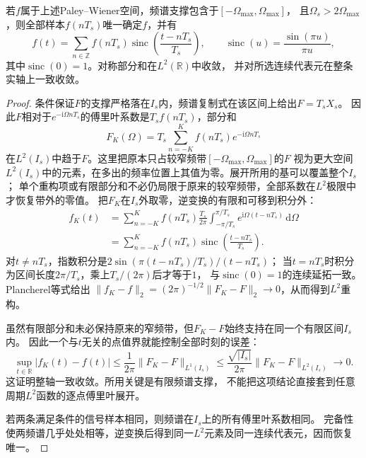 \begin{theorem}[带限信号的采样重构]
  \label{thm:signal-analysis-sampling}
  若$f$属于上述Paley--Wiener空间，频谱支撑包含于$[-\Omega_{\max},\Omega_{\max}]$，
  且$\Omega_s>2\Omega_{\max}$，则全部样本$f(nT_s)$唯一确定$f$，并有
  \begin{equation}
    f(t)=\sum_{n\in\mathbb Z}f(nT_s)
    \operatorname{sinc}\left(\frac{t-nT_s}{T_s}\right),
    \qquad \operatorname{sinc}(u)=\frac{\sin(\pi u)}{\pi u},
    \label{eq:signal-analysis-sinc-reconstruction}
  \end{equation}
  其中$\operatorname{sinc}(0)=1$。对称部分和在$L^2(\mathbb R)$中收敛，
  并对所选连续代表元在整条实轴上一致收敛。
\end{theorem}
\begin{proof}
  条件保证$F$的支撑严格落在$I_s$内，频谱复制式在该区间上给出$F=T_sX_s$。
  因此$F$相对于$e^{-\mathrm i\Omega nT_s}$的傅里叶系数是$T_sf(nT_s)$，部分和
  \[
    F_K(\Omega)=T_s\sum_{n=-K}^{K}f(nT_s)e^{-\mathrm i\Omega nT_s}
  \]
  在$L^2(I_s)$中趋于$F$。这里把原本只占较窄频带$[-\Omega_{\max},\Omega_{\max}]$的$F$
  视为更大空间$L^2(I_s)$中的元素，在多出的频率位置上其值为零。展开所用的基可以覆盖整个$I_s$；
  单个重构项或有限部分和不必仍局限于原来的较窄频带，全部系数在$L^2$极限中才恢复带外的零值。
  把$F_K$在$I_s$外取零，逆变换的有限和可移到积分外：
  \begin{align*}
    f_K(t)
    &=\sum_{n=-K}^{K}f(nT_s)\frac{T_s}{2\pi}
      \int_{-\pi/T_s}^{\pi/T_s}e^{\mathrm i\Omega(t-nT_s)}\,\mathrm d\Omega\\
    &=\sum_{n=-K}^{K}f(nT_s)
      \operatorname{sinc}\left(\frac{t-nT_s}{T_s}\right).
  \end{align*}
  对$t\neq nT_s$，指数积分是$2\sin(\pi(t-nT_s)/T_s)/(t-nT_s)$；
  当$t=nT_s$时积分为区间长度$2\pi/T_s$，乘上$T_s/(2\pi)$后才等于$1$，
  与$\operatorname{sinc}(0)=1$的连续延拓一致。
  Plancherel等式给出
  $\|f_K-f\|_2=(2\pi)^{-1/2}\|F_K-F\|_2\to0$，从而得到$L^2$重构。

  虽然有限部分和未必保持原来的窄频带，但$F_K-F$始终支持在同一个有限区间$I_s$内。
  因此一个与$t$无关的点值界就能控制全部时刻的误差：
  \[
    \sup_{t\in\mathbb R}|f_K(t)-f(t)|
    \leq\frac1{2\pi}\|F_K-F\|_{L^1(I_s)}
    \leq\frac{\sqrt{|I_s|}}{2\pi}\|F_K-F\|_{L^2(I_s)}
    \longrightarrow0.
  \]
  这证明整轴一致收敛。所用关键是有限频谱支撑，
  不能把这项结论直接套到任意周期$L^2$函数的逐点傅里叶展开。

  若两条满足条件的信号样本相同，则频谱在$I_s$上的所有傅里叶系数相同。
  完备性使两频谱几乎处处相等，逆变换后得到同一$L^2$元素及同一连续代表元，因而恢复唯一。
\end{proof}

